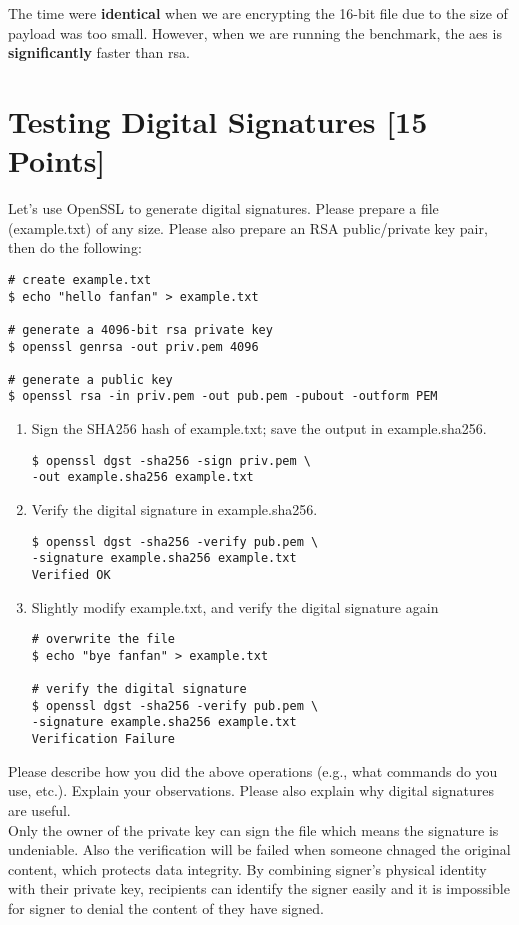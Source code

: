 \documentclass[11pt]{article}
\begin{document}
The time were \textbf{identical} when we are encrypting the 16-bit file due to the size of payload was too small. However, when we are running the benchmark, the aes is \textbf{significantly} faster than rsa.

\medskip

\section{Testing Digital Signatures [15 Points]}
Let's use OpenSSL to generate digital signatures. Please prepare a file (example.txt) of
any size. Please also prepare an RSA public/private key pair, then do the following:

\begin{verbatim}
# create example.txt
$ echo "hello fanfan" > example.txt

# generate a 4096-bit rsa private key
$ openssl genrsa -out priv.pem 4096

# generate a public key
$ openssl rsa -in priv.pem -out pub.pem -pubout -outform PEM
\end{verbatim}

\begin{enumerate}
\item Sign the SHA256 hash of example.txt; save the output in example.sha256.
\begin{verbatim}
$ openssl dgst -sha256 -sign priv.pem \
-out example.sha256 example.txt
\end{verbatim}
\item Verify the digital signature in example.sha256.
\begin{verbatim}
$ openssl dgst -sha256 -verify pub.pem \
-signature example.sha256 example.txt
Verified OK
\end{verbatim}
\item Slightly modify example.txt, and verify the digital signature again
\begin{verbatim}
# overwrite the file
$ echo "bye fanfan" > example.txt

# verify the digital signature
$ openssl dgst -sha256 -verify pub.pem \
-signature example.sha256 example.txt
Verification Failure
\end{verbatim}
\end{enumerate}
Please describe how you did the above operations (e.g., what commands do you use, etc.). Explain your
observations. Please also explain why digital signatures are useful. \\

Only the owner of the private key can sign the file which means the signature is undeniable. Also the verification will be failed when someone chnaged the original content, which protects data integrity. By combining signer's physical identity with their private key, recipients can identify the signer easily and it is impossible for signer to denial the content of they have signed. \\
\end{document}
